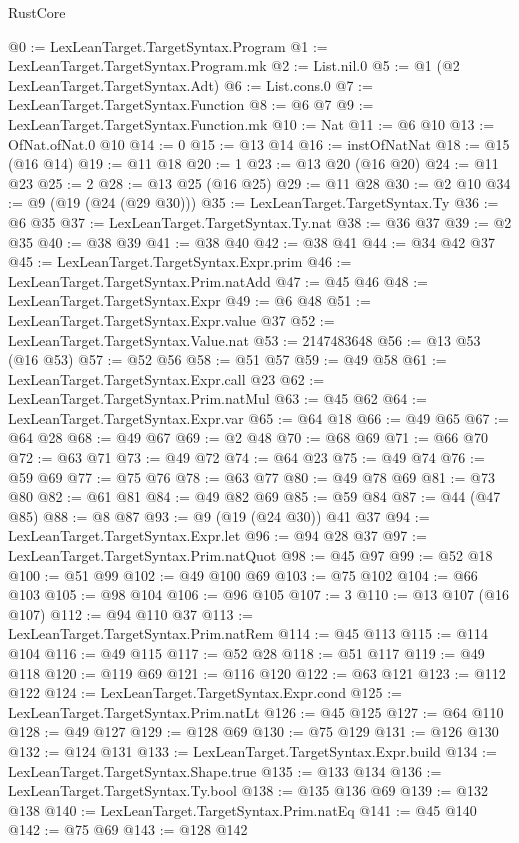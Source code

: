 \begin{lexlean}{RustCore}
\begin{coremodule}
@0 := LexLeanTarget.TargetSyntax.Program
@1 := LexLeanTarget.TargetSyntax.Program.mk
@2 := List.nil.{0}
@5 := @1 (@2 LexLeanTarget.TargetSyntax.Adt)
@6 := List.cons.{0}
@7 := LexLeanTarget.TargetSyntax.Function
@8 := @6 @7
@9 := LexLeanTarget.TargetSyntax.Function.mk
@10 := Nat
@11 := @6 @10
@13 := OfNat.ofNat.{0} @10
@14 := 0
@15 := @13 @14
@16 := instOfNatNat
@18 := @15 (@16 @14)
@19 := @11 @18
@20 := 1
@23 := @13 @20 (@16 @20)
@24 := @11 @23
@25 := 2
@28 := @13 @25 (@16 @25)
@29 := @11 @28
@30 := @2 @10
@34 := @9 (@19 (@24 (@29 @30)))
@35 := LexLeanTarget.TargetSyntax.Ty
@36 := @6 @35
@37 := LexLeanTarget.TargetSyntax.Ty.nat
@38 := @36 @37
@39 := @2 @35
@40 := @38 @39
@41 := @38 @40
@42 := @38 @41
@44 := @34 @42 @37
@45 := LexLeanTarget.TargetSyntax.Expr.prim
@46 := LexLeanTarget.TargetSyntax.Prim.natAdd
@47 := @45 @46
@48 := LexLeanTarget.TargetSyntax.Expr
@49 := @6 @48
@51 := LexLeanTarget.TargetSyntax.Expr.value @37
@52 := LexLeanTarget.TargetSyntax.Value.nat
@53 := 2147483648
@56 := @13 @53 (@16 @53)
@57 := @52 @56
@58 := @51 @57
@59 := @49 @58
@61 := LexLeanTarget.TargetSyntax.Expr.call @23
@62 := LexLeanTarget.TargetSyntax.Prim.natMul
@63 := @45 @62
@64 := LexLeanTarget.TargetSyntax.Expr.var
@65 := @64 @18
@66 := @49 @65
@67 := @64 @28
@68 := @49 @67
@69 := @2 @48
@70 := @68 @69
@71 := @66 @70
@72 := @63 @71
@73 := @49 @72
@74 := @64 @23
@75 := @49 @74
@76 := @59 @69
@77 := @75 @76
@78 := @63 @77
@80 := @49 @78 @69
@81 := @73 @80
@82 := @61 @81
@84 := @49 @82 @69
@85 := @59 @84
@87 := @44 (@47 @85)
@88 := @8 @87
@93 := @9 (@19 (@24 @30)) @41 @37
@94 := LexLeanTarget.TargetSyntax.Expr.let
@96 := @94 @28 @37
@97 := LexLeanTarget.TargetSyntax.Prim.natQuot
@98 := @45 @97
@99 := @52 @18
@100 := @51 @99
@102 := @49 @100 @69
@103 := @75 @102
@104 := @66 @103
@105 := @98 @104
@106 := @96 @105
@107 := 3
@110 := @13 @107 (@16 @107)
@112 := @94 @110 @37
@113 := LexLeanTarget.TargetSyntax.Prim.natRem
@114 := @45 @113
@115 := @114 @104
@116 := @49 @115
@117 := @52 @28
@118 := @51 @117
@119 := @49 @118
@120 := @119 @69
@121 := @116 @120
@122 := @63 @121
@123 := @112 @122
@124 := LexLeanTarget.TargetSyntax.Expr.cond
@125 := LexLeanTarget.TargetSyntax.Prim.natLt
@126 := @45 @125
@127 := @64 @110
@128 := @49 @127
@129 := @128 @69
@130 := @75 @129
@131 := @126 @130
@132 := @124 @131
@133 := LexLeanTarget.TargetSyntax.Expr.build
@134 := LexLeanTarget.TargetSyntax.Shape.true
@135 := @133 @134
@136 := LexLeanTarget.TargetSyntax.Ty.bool
@138 := @135 @136 @69
@139 := @132 @138
@140 := LexLeanTarget.TargetSyntax.Prim.natEq
@141 := @45 @140
@142 := @75 @69
@143 := @128 @142

\end{coremodule}
\end{lexlean}
